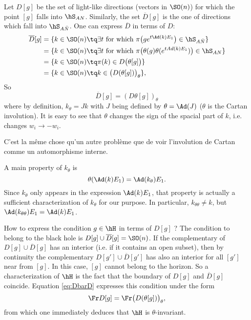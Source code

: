 Let $D[g]$ be the set of light-like directions (vectors in $\SO(n)$) for which the point $[g]$ falls into $\hS_{AN}$. Similarly, the set $\overline{D}[g]$ is the one of directions which fall into $\hS_{A \bar{N}}$. One can express $\overline{ D }$ in terms of $D$:
\[
\begin{split}
\overline{ D }[g]&=\{ k\in\SO(n)\tq\exists t\text{ for which }\pi\big( g e^{t\Ad(k)E_1} \big)\in\hS_{A\bar N} \}\\
		&=\{ k\in\SO(n)\tq\exists t\text{ for which }\pi\big( \theta(g)\theta( e^{tAd(k)E_1}) \big)\in\hS_{AN}\}\\
		&=\{ k\in\SO(n)\tq \pi(k)\in D\big( \theta[g] \big)\}\\
		&=\{ k\in\SO(n)\tq k\in\big( D(\theta[g]) \big)_{\theta}\},
\end{split}
\]
So
\begin{equation} \label{eq:DbarD}
\overline{D}[g]=(D\theta[g])_{\theta}
\end{equation}
where by definition, $k_{\theta}=Jk$ with $J$ being defined by $\theta=\Ad(J)$ ($\theta$ is the Cartan involution). It is easy to see that $\theta$ changes the sign of the spacial part of $k$, i.e. changes $w_i\to -w_i$.

\begin{probleme}
C'est la même chose qu'un autre problème que de voir l'involution de Cartan comme un automorphisme interne.
\label{propCrtadeux}
\end{probleme}

 A main property of $k_{\theta}$ is
\[
	\theta(\Ad(k)E_1)=\Ad(k_{\theta})E_1.
\]
Since $k_{\theta}$ only appears in the expression $\Ad(k)E_1$, that property is actually a sufficient characterization of $k_{\theta}$ for our purpose. In particular, $k_{\theta\theta}\neq k$, but $\Ad(k_{\theta\theta})E_1=\Ad(k)E_1$.

How to express the condition $g\in\hH$ in terms of $D[g]$ ? The condition to belong to the black hole is $D[g]\cup \overline{D}[g]=\SO(n)$. If the complementary of $D[g]\cup \overline{D}[g]$ has an interior (i.e. if it contains an open subset), then by continuity the complementary $D[g']\cup \overline{D}[g']$ has also an interior for all $[g']$ near from $[g]$. In this case, $[g]$ cannot belong to the horizon. So a characterization of $\hH$ is the fact that the boundary of $D[g]$ and $\overline{D}[g]$ coincide. Equation \eqref{eq:DbarD} expresses this condition under the form
\begin{equation}
  \Fr D[g]=\Fr \big( D(\theta[g])\big)_{\theta},
 \end{equation}
from which one immediately deduces that $\hH$ is $\theta$-invariant.


